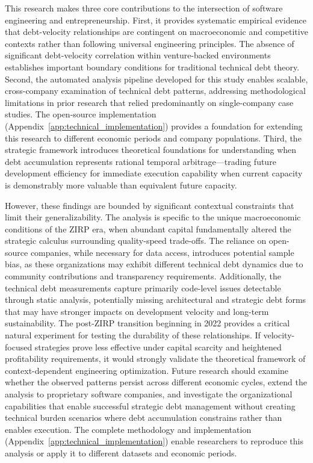 This research makes three core contributions to the intersection of software engineering and entrepreneurship. First, it provides systematic empirical evidence that debt-velocity relationships are contingent on macroeconomic and competitive contexts rather than following universal engineering principles. The absence of significant debt-velocity correlation within venture-backed environments establishes important boundary conditions for traditional technical debt theory. Second, the automated analysis pipeline developed for this study enables scalable, cross-company examination of technical debt patterns, addressing methodological limitations in prior research that relied predominantly on single-company case studies. The open-source implementation (Appendix~\ref{app:technical_implementation}) provides a foundation for extending this research to different economic periods and company populations. Third, the strategic framework introduces theoretical foundations for understanding when debt accumulation represents rational temporal arbitrage—trading future development efficiency for immediate execution capability when current capacity is demonstrably more valuable than equivalent future capacity.

However, these findings are bounded by significant contextual constraints that limit their generalizability. The analysis is specific to the unique macroeconomic conditions of the \ac{ZIRP} era, when abundant capital fundamentally altered the strategic calculus surrounding quality-speed trade-offs. The reliance on open-source companies, while necessary for data access, introduces potential sample bias, as these organizations may exhibit different technical debt dynamics due to community contributions and transparency requirements. Additionally, the technical debt measurements capture primarily code-level issues detectable through static analysis, potentially missing architectural and strategic debt forms that may have stronger impacts on development velocity and long-term sustainability.
The post-\ac{ZIRP} transition beginning in 2022 provides a critical natural experiment for testing the durability of these relationships. If velocity-focused strategies prove less effective under capital scarcity and heightened profitability requirements, it would strongly validate the theoretical framework of context-dependent engineering optimization. Future research should examine whether the observed patterns persist across different economic cycles, extend the analysis to proprietary software companies, and investigate the organizational capabilities that enable successful strategic debt management without creating technical burden scenarios where debt accumulation constrains rather than enables execution. The complete methodology and implementation (Appendix~\ref{app:technical_implementation}) enable researchers to reproduce this analysis or apply it to different datasets and economic periods.

